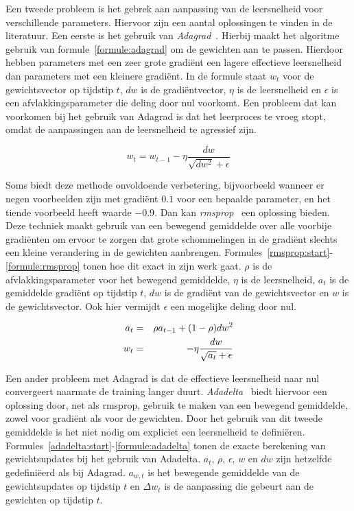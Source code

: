 Een tweede probleem is het gebrek aan aanpassing van de leersnelheid voor verschillende parameters. Hiervoor zijn een aantal oplossingen te vinden in de literatuur. Een eerste is het gebruik van \emph{Adagrad}~\cite{Duchi2011}. Hierbij maakt het algoritme gebruik van formule~\eqref{formule:adagrad} om de gewichten aan te passen. Hierdoor hebben parameters met een zeer grote gradi\"ent een lagere effectieve leersnelheid dan parameters met een kleinere gradi\"ent. In de formule staat $w_t$ voor de gewichtsvector op tijdstip $t$, $dw$ is de gradi\"entvector, $\eta$ is de leersnelheid en $\epsilon$ is een afvlakkingsparameter die deling door nul voorkomt. Een probleem dat kan voorkomen bij het gebruik van Adagrad is dat het leerproces te vroeg stopt, omdat de aanpassingen aan de leersnelheid te agressief zijn.
 
\begin{equation}
    w_t = w_{t-1} - \eta \frac{dw}{\sqrt{dw^2} + \epsilon}
    \label{formule:adagrad}
\end{equation}

Soms biedt deze methode onvoldoende verbetering, bijvoorbeeld wanneer er negen voorbeelden zijn met gradi\"ent $0.1$ voor een bepaalde parameter, en het tiende voorbeeld heeft waarde $-0.9$. Dan kan \emph{rmsprop}~\cite{RMSprop} een oplossing bieden. Deze techniek maakt gebruik van een bewegend gemiddelde over alle voorbije gradi\"enten om ervoor te zorgen dat grote schommelingen in de gradi\"ent slechts een kleine verandering in de gewichten aanbrengen. Formules~\eqref{rmsprop:start}-\eqref{formule:rmsprop} tonen hoe dit exact in zijn werk gaat. $\rho$ is de afvlakkingsparameter voor het bewegend gemiddelde, $\eta$ is de leersnelheid, $a_t$ is de gemiddelde gradi\"ent op tijdstip $t$, $dw$ is de gradi\"ent van de gewichtsvector en $w$ is de gewichtsvector. Ook hier vermijdt $\epsilon$ een mogelijke deling door nul.

\begin{eqnarray}
\vspace{-3mm}
    \label{rmsprop:start}
    a_t & = & \rho  a_{t-1} + (1 - \rho)dw^2 \\
    w_t & = &  - \eta \frac{dw}{\sqrt{a_t} + \epsilon}
    \label{formule:rmsprop}
    \vspace{-3mm}
\end{eqnarray}

Een ander probleem met Adagrad is dat de effectieve leersnelheid naar nul convergeert naarmate de training langer duurt. \emph{Adadelta}~\cite{Zeiler2012} biedt hiervoor een oplossing door, net als rmsprop, gebruik te maken van een bewegend gemiddelde, zowel voor gradi\"ent als voor de gewichten. Door het gebruik van dit tweede gemiddelde is het niet nodig om expliciet een leersnelheid te defini\"eren. Formules~\eqref{adadelta:start}-\eqref{formule:adadelta} tonen de exacte berekening van gewichtsupdates bij het gebruik van Adadelta. $a_t$, $\rho$, $\epsilon$, $w$ en $dw$ zijn hetzelfde gedefini\"eerd als bij Adagrad. $a_{w,t}$ is het bewegende gemiddelde van de gewichtsupdates op tijdstip $t$ en $\Delta w_t$ is de aanpassing die gebeurt aan de gewichten op tijdstip $t$.

